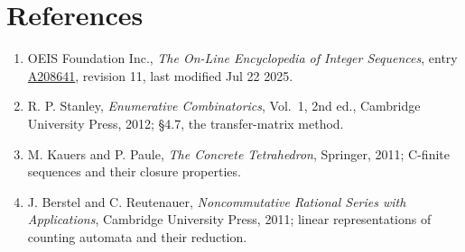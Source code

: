 \documentclass[11pt]{article}
\theoremstyle{definition}
\begin{document}
\section{References}

\begin{enumerate}

\item OEIS Foundation Inc., \emph{The On-Line Encyclopedia of Integer Sequences}, entry \href{https://oeis.org/A208641}{A208641}, revision 11, last modified Jul 22 2025.

\item R. P. Stanley, \emph{Enumerative Combinatorics}, Vol.~1, 2nd ed., Cambridge University Press, 2012; \S4.7, the transfer-matrix method.

\item M. Kauers and P. Paule, \emph{The Concrete Tetrahedron}, Springer, 2011; C-finite sequences and their closure properties.

\item J. Berstel and C. Reutenauer, \emph{Noncommutative Rational Series with Applications}, Cambridge University Press, 2011; linear representations of counting automata and their reduction.

\end{enumerate}
\end{document}
